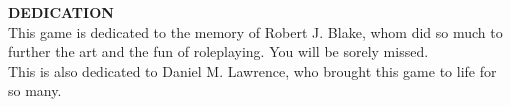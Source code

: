 \textbf{DEDICATION}\\

\vspace*{1cm}
This game is dedicated to the memory of Robert J. Blake, whom did so much to further the art and the fun of roleplaying.
You will be sorely missed.\\

\vspace*{1cm}
This is also dedicated to Daniel M. Lawrence, who brought this game to life for so many.